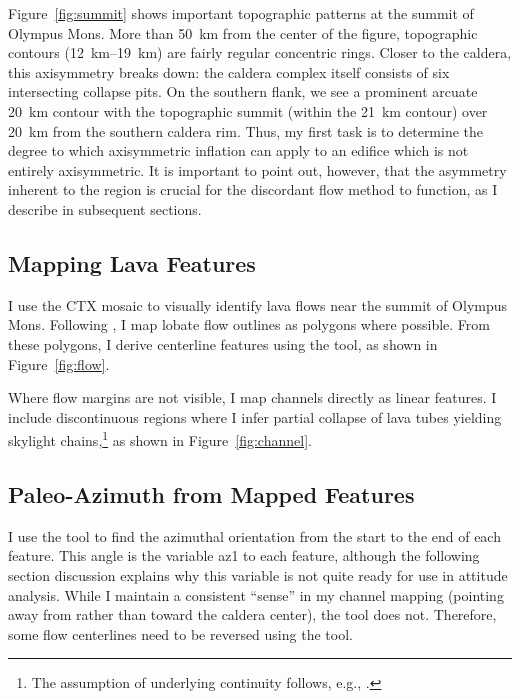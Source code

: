 Figure~\ref{fig:summit} shows important topographic patterns at the summit of Olympus Mons. More than \qty{50}{\km} from the center of the figure, topographic contours (\qtyrange{12}{19}{\km}) are fairly regular concentric rings. Closer to the caldera, this axisymmetry breaks down: the caldera complex itself consists of six intersecting collapse pits. On the southern flank, we see a prominent arcuate \qty{20}{\km} contour with the topographic summit (within the \qty{21}{\km} contour) over \qty{20}{\km} from the southern caldera rim. Thus, my first task is to determine the degree to which axisymmetric inflation can apply to an edifice which is not entirely axisymmetric. It is important to point out, however, that the asymmetry inherent to the region is crucial for the discordant flow method to function, as I describe in subsequent sections. 

\subsection{Mapping Lava Features}

I use the \ac{CTX} mosaic to visually identify lava flows near the summit of Olympus Mons. Following \textcite{mouginis-mark_geologic_2021}, I map lobate flow outlines as polygons where possible. From these polygons, I derive centerline features using the  tool, as shown in Figure~\ref{fig:flow}.

Where flow margins are not visible, I map channels directly as linear features. I include discontinuous regions where I infer partial collapse of lava tubes yielding skylight chains,\footnote{The assumption of underlying continuity follows, e.g., \textcite{bleacher_olympus_2007,carr_geologic_2010,peters_lava_2021}.} as shown in Figure~\ref{fig:channel}.

\subsection{Paleo-Azimuth from Mapped Features}

I use the  tool to find the azimuthal orientation from the start to the end of each feature. This angle is the variable \ac{az1} to each feature, although the following section discussion explains why this variable is not quite ready for use in attitude analysis. While I maintain a consistent ``sense'' in my channel mapping (pointing away from rather than toward the caldera center), the  tool does not. Therefore, some flow centerlines need to be reversed using the  tool.

